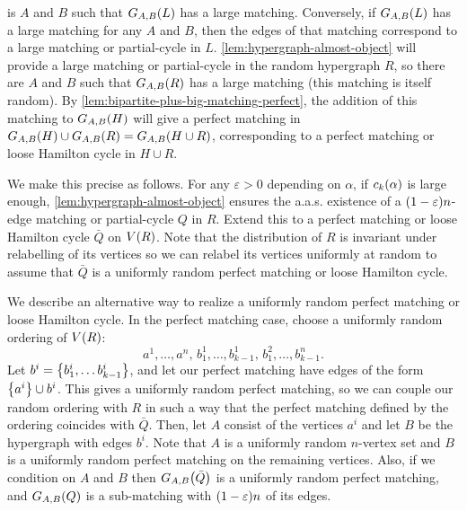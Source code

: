 \documentclass[11pt,english]{article}
\theoremstyle{plain}
\theoremstyle{definition}
\theoremstyle{definition}
\theoremstyle{plain}
\theoremstyle{plain}
\theoremstyle{plain}
\theoremstyle{plain}
\theoremstyle{remark}
\theoremstyle{remark}
\let\originalleft\left
\let\originalright\right
\renewcommand{\left}{\mathopen{}\mathclose\bgroup\originalleft}
\renewcommand{\right}{\aftergroup\egroup\originalright}
\begin{document}
is $A$ and $B$ such that $G_{A,B}\left(L\right)$ has a large matching. Conversely,
if $G_{A,B}\left(L\right)$ has a large matching for any $A$
and $B$, then the edges of that matching correspond to a large matching or partial-cycle in $L$. \ref{lem:hypergraph-almost-object}
will provide a large matching or partial-cycle in the random hypergraph $R$, so there are $A$
and $B$ such that $G_{A,B}\left(R\right)$ has a large matching (this matching is itself random).
By \ref{lem:bipartite-plus-big-matching-perfect}, the addition of
this matching to $G_{A,B}\left(H\right)$ will give a perfect
matching in $G_{A,B}\left(H\right)\cup G_{A,B}\left(R\right)=G_{A,B}\left(H\cup R\right)$,
corresponding to a perfect matching or loose Hamilton cycle in $H\cup R$.

We make this precise as follows. For any $\varepsilon>0$ depending on $\alpha$, if $\chyp\left(\alpha\right)$
is large enough, \ref{lem:hypergraph-almost-object} ensures the a.a.s.
existence of a $\left(1-\varepsilon\right)n$-edge matching or partial-cycle $Q$ in $R$. Extend this to a perfect matching or loose Hamilton cycle
$\bar{Q}$ on $V\left(R\right)$. Note that the distribution of $R$
is invariant under relabelling of its vertices so we can relabel its
vertices uniformly at random to assume that $\bar{Q}$ is a uniformly
random perfect matching or loose Hamilton cycle.

We describe an alternative way to realize a uniformly random perfect
matching or loose Hamilton cycle. In the perfect matching case, choose a
uniformly random ordering of $V\left(R\right)$: 
\[
a^{1},\dots,a^{n},\, b_{1}^{1},\dots,b_{k-1}^{1},\, b_{1}^{2},\dots,b_{k-1}^{n}.
\]
Let $b^{i}=\left\{ b_{1}^{i},\dots b_{k-1}^{i}\right\}$, and let our perfect matching have edges of the form $\left\{a^{i}\right\}\cup b^i $.
This gives a uniformly random perfect matching, so we can couple our
random ordering with $R$ in such a way that the perfect matching
defined by the ordering coincides with $\bar{Q}$. Then, let $A$
consist of the vertices $a^{i}$ and let $B$ be the hypergraph with
edges $b^i$.
Note that $A$ is a uniformly random $n$-vertex set and $B$ is a
uniformly random perfect matching on the remaining vertices. Also,
if we condition on $A$ and $B$ then $G_{A,B}\left(\bar{Q}\right)$
is a uniformly random perfect matching, and $G_{A,B}\left(Q\right)$
is a sub-matching with $\left(1-\varepsilon\right)n$ of its edges.
\end{document}
